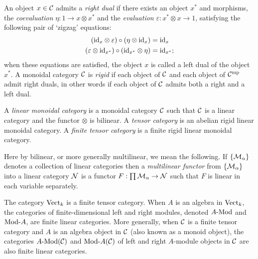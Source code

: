 \documentclass{amsart}
\begin{document}
\begin{definition} \label{def:rigid}
	An object $x \in \mathcal C$ admits a {\em right dual} if there exists an object $x^*$ and morphisms, the {\em coevaluation} $\eta: 1 \to x \otimes x^*$ and the {\em evaluation} $\varepsilon: x^* \otimes x \to 1$, satisfying the following pair of `zigzag' equations:
	\begin{align*}
		(\mathrm{id}_{x} \otimes \varepsilon  ) \circ (  \eta \otimes \mathrm{id}_{x}) &= \mathrm{id}_{x} \\
		(\varepsilon \otimes \mathrm{id}_{x^*}) \circ (\mathrm{id}_{x^*} \otimes \eta) &= \mathrm{id}_{x^*};
	\end{align*}
	when these equations are satisfied, the object $x$ is called a left dual of the object $x^*$.  A monoidal category $\mathcal C$ is {\em rigid} if each object of $\mathcal C$ and each object of $\mathcal C^{\mathrm{mp}}$ admit right duals, in other words if each object of $\mathcal C$ admits both a right and a left dual. 
\end{definition}



\begin{definition}
	A {\em linear monoidal category} is a monoidal category $\mathcal C$ such that $\mathcal C$ is a linear category and the functor $\otimes$ is bilinear.  A {\em tensor category} is an abelian rigid linear monoidal category.  A {\em finite tensor category} is a finite rigid linear monoidal category.   
\end{definition}

\nid Here by bilinear, or more generally multilinear, we mean the following.  If $\{\mathcal M_\alpha\}$ denotes a collection of linear categories then a {\em multilinear functor} from $\{\mathcal M_\alpha\}$ into a linear category $\mathcal N$ is a functor $F: \prod \mathcal M_\alpha \to \mathcal N$ such that $F$ is linear in each variable separately. 



\begin{example}
	The category $\mathrm{Vect}_k$ is a finite tensor category. When $A$ is an algebra in $\mathrm{Vect}_k$, the categories of finite-dimensional left and right modules, denoted $\Mod{A}{}$ and $\Mod{}{A}$, are finite linear categories. More generally, when $\mathcal C$ is a finite tensor category and $A$ is an algebra object in $\mathcal C$ (also known as a monoid object), the categories $\Mod{A}{}(\cC)$ and $\Mod{}{A}(\cC)$ of left and right $A$-module objects in $\mathcal C$ are also finite linear categories.
\end{example}
\end{document}
